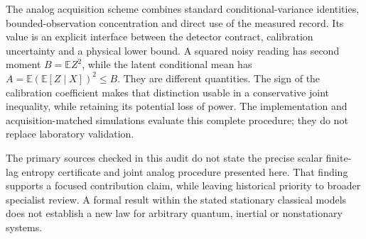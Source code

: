 The analog acquisition scheme combines standard conditional-variance
identities, bounded-observation concentration and direct use of the measured
record. Its value is an explicit interface between the detector contract,
calibration uncertainty and a physical lower bound. A squared noisy reading
has second moment $B=\mathbb{E}Z^2$, while the latent conditional mean has
$A=\mathbb{E}(\mathbb{E}[Z\mid X])^2\leq B$. They are different quantities.
The sign of the calibration coefficient makes that distinction usable in a
conservative joint inequality, while retaining its potential loss of power.
The implementation and acquisition-matched simulations evaluate this complete
procedure; they do not replace laboratory validation.

The primary sources checked in this audit do not state the precise scalar
finite-lag entropy certificate and joint analog procedure presented here.
That finding supports a focused contribution claim, while leaving historical
priority to broader specialist review. A formal result within the stated
stationary classical models does not establish a new law for arbitrary
quantum, inertial or nonstationary systems.
